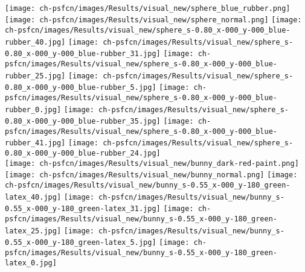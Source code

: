 \begin{minipage}{0.97\textwidth}
 \\
 \texttt{[image: ch-psfcn/images/Results/visual\_new/sphere\_blue\_rubber.png]}
 \texttt{[image: ch-psfcn/images/Results/visual\_new/sphere\_normal.png]}
 \texttt{[image: ch-psfcn/images/Results/visual\_new/sphere\_s-0.80\_x-000\_y-000\_blue-rubber\_40.jpg]}
 \texttt{[image: ch-psfcn/images/Results/visual\_new/sphere\_s-0.80\_x-000\_y-000\_blue-rubber\_31.jpg]}
 \texttt{[image: ch-psfcn/images/Results/visual\_new/sphere\_s-0.80\_x-000\_y-000\_blue-rubber\_25.jpg]}
 \texttt{[image: ch-psfcn/images/Results/visual\_new/sphere\_s-0.80\_x-000\_y-000\_blue-rubber\_5.jpg]}
 \texttt{[image: ch-psfcn/images/Results/visual\_new/sphere\_s-0.80\_x-000\_y-000\_blue-rubber\_0.jpg]}
 \texttt{[image: ch-psfcn/images/Results/visual\_new/sphere\_s-0.80\_x-000\_y-000\_blue-rubber\_35.jpg]}
 \texttt{[image: ch-psfcn/images/Results/visual\_new/sphere\_s-0.80\_x-000\_y-000\_blue-rubber\_41.jpg]}
 \texttt{[image: ch-psfcn/images/Results/visual\_new/sphere\_s-0.80\_x-000\_y-000\_blue-rubber\_24.jpg]}
 \\
 \texttt{[image: ch-psfcn/images/Results/visual\_new/bunny\_dark-red-paint.png]}
 \texttt{[image: ch-psfcn/images/Results/visual\_new/bunny\_normal.png]}
 \texttt{[image: ch-psfcn/images/Results/visual\_new/bunny\_s-0.55\_x-000\_y-180\_green-latex\_40.jpg]}
 \texttt{[image: ch-psfcn/images/Results/visual\_new/bunny\_s-0.55\_x-000\_y-180\_green-latex\_31.jpg]}
 \texttt{[image: ch-psfcn/images/Results/visual\_new/bunny\_s-0.55\_x-000\_y-180\_green-latex\_25.jpg]}
 \texttt{[image: ch-psfcn/images/Results/visual\_new/bunny\_s-0.55\_x-000\_y-180\_green-latex\_5.jpg]}
 \texttt{[image: ch-psfcn/images/Results/visual\_new/bunny\_s-0.55\_x-000\_y-180\_green-latex\_0.jpg]}

\end{minipage}
